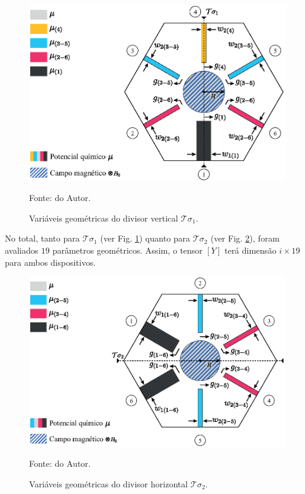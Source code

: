 \begin{figure}[H]
	\centering\includegraphics{04-Figuras/VariaveisGeometriaVertical.eps}
	\caption{Variáveis geométricas do divisor vertical $\mathcal{T}\sigma_{1}$.}
    Fonte: do Autor.
	\label{fig: VariaveisGeometriaVertical}
\end{figure}

No total, tanto para $\mathcal{T}\sigma_{1}$ (ver Fig. \ref{fig: VariaveisGeometriaVertical}) quanto para $\mathcal{T}\sigma_{2}$ (ver Fig. \ref{fig: VariaveisGeometriaHorizontal}), foram avaliados $19$ parâmetros geométricos. Assim, o tensor $[Y]$ terá dimensão $i \times 19$ para ambos dispositivos.

\begin{figure}[H]
	\centering\includegraphics{04-Figuras/VariaveisGeometriaHorizontal.eps}
	\caption{Variáveis geométricas do divisor horizontal $\mathcal{T}\sigma_{2}$.}
    Fonte: do Autor.
	\label{fig: VariaveisGeometriaHorizontal}
\end{figure}

